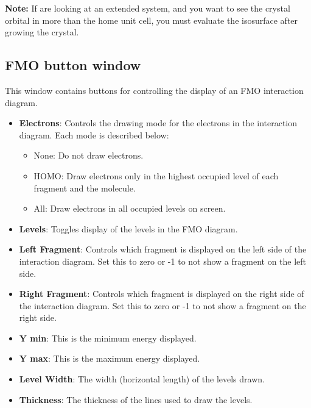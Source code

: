 {\bf Note:}  If are looking at an extended system, and you want to see
the crystal orbital in more than the home unit cell, you must
evaluate the isosurface after growing the crystal.


\subsection{FMO button window}

This window contains buttons for controlling the display of an FMO
interaction diagram.

\begin{itemize}
\item {\bf Electrons}:  Controls the drawing mode for the electrons in
the interaction diagram.  Each mode is described below:

\begin{itemize}
\item None: Do not draw electrons.

\item HOMO: Draw electrons only in the highest occupied level of each
fragment and the molecule.

\item All: Draw electrons in all occupied levels on screen.
\end{itemize}

\item {\bf Levels}: Toggles display of the levels in the FMO diagram.

\item {\bf Left Fragment}: Controls which fragment is displayed on the
left side of the interaction diagram.  Set this to zero or -1 to not
show a fragment on the left side.

\item {\bf Right Fragment}: Controls which fragment is displayed on the
right side of the interaction diagram.  Set this to zero or -1 to not
show a fragment on the right side.

\item {\bf Y min}: This is the minimum energy displayed.

\item {\bf Y max}: This is the maximum energy displayed.

\item {\bf Level Width}: The width (horizontal length) of the levels
drawn.

\item {\bf Thickness}: The thickness of the lines used to draw the
levels.


\end{itemize}
